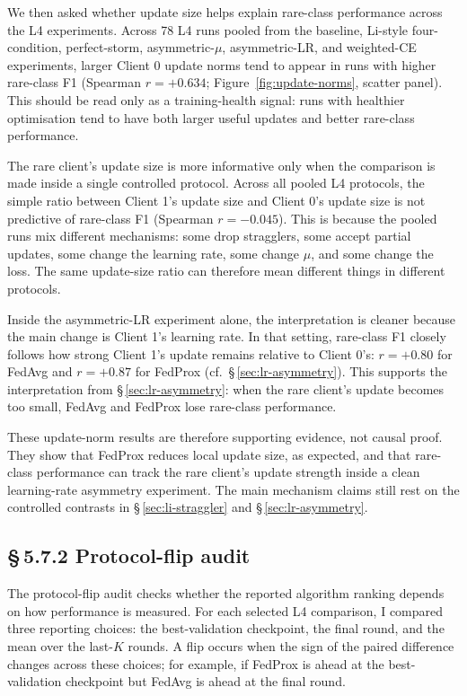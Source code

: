\documentclass[11pt,a4paper]{report}
\begin{document}
We then asked whether update size helps explain rare-class performance across
the L4 experiments. Across 78 L4 runs pooled from the baseline, Li-style
four-condition, perfect-storm, asymmetric-$\mu$, asymmetric-LR, and
weighted-CE experiments, larger Client 0 update norms tend to appear in runs
with higher rare-class F1 (Spearman $r=+0.634$;
Figure~\ref{fig:update-norms}, scatter panel). This should be read only as a
training-health signal: runs with healthier optimisation tend to have both
larger useful updates and better rare-class performance.

The rare client's update size is more informative only when the comparison is
made inside a single controlled protocol. Across all pooled L4 protocols, the
simple ratio between Client 1's update size and Client 0's update size is not
predictive of rare-class F1 (Spearman $r=-0.045$). This is because the pooled
runs mix different mechanisms: some drop stragglers, some accept partial
updates, some change the learning rate, some change $\mu$, and some change
the loss. The same update-size ratio can therefore mean different things in
different protocols.

Inside the asymmetric-LR experiment alone, the interpretation is cleaner
because the main change is Client 1's learning rate. In that setting, rare-class
F1 closely follows how strong Client 1's update remains relative to Client 0's:
$r=+0.80$ for FedAvg and $r=+0.87$ for FedProx
(cf.\ \S\,\ref{sec:lr-asymmetry}). This supports the interpretation from
\S\,\ref{sec:lr-asymmetry}: when the rare client's update becomes too small,
FedAvg and FedProx lose rare-class performance.

These update-norm results are therefore supporting evidence, not causal proof.
They show that FedProx reduces local update size, as expected, and that rare-
class performance can track the rare client's update strength inside a clean
learning-rate asymmetry experiment. The main mechanism claims still rest on
the controlled contrasts in \S\,\ref{sec:li-straggler} and
\S\,\ref{sec:lr-asymmetry}.
\subsection*{\S\,5.7.2 Protocol-flip audit}

The protocol-flip audit checks whether the reported algorithm ranking depends
on how performance is measured. For each selected L4 comparison, I compared
three reporting choices: the best-validation checkpoint, the final round, and
the mean over the last-$K$ rounds. A flip occurs when the sign of the paired
difference changes across these choices; for example, if FedProx is ahead at
the best-validation checkpoint but FedAvg is ahead at the final round.
\end{document}
